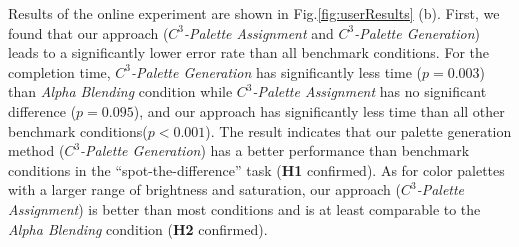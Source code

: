 {Results of the online experiment are shown in Fig.\ref{fig:userResults} (b).
First, we found that our approach (\emph{$C^3$-Palette Assignment} and \emph{$C^3$-Palette Generation}) leads to a significantly lower error rate than all benchmark conditions. For the completion time, \emph{$C^3$-Palette Generation} has significantly less time (\emph{$p = 0.003$}) than \emph{Alpha Blending} condition while \emph{$C^3$-Palette Assignment} has no significant difference (\emph{$p = 0.095$}), and our approach has significantly less time than all other benchmark conditions(\emph{$p < 0.001$}). The result indicates that our palette generation method (\emph{$C^3$-Palette Generation}) has a better performance than benchmark conditions in the ``spot-the-difference'' task (\textbf{H1} confirmed). As for color palettes with a larger range of brightness and saturation, our approach (\emph{$C^3$-Palette Assignment}) is better than most conditions and is at least comparable to the \emph{Alpha Blending} condition (\textbf{H2} confirmed).




}
